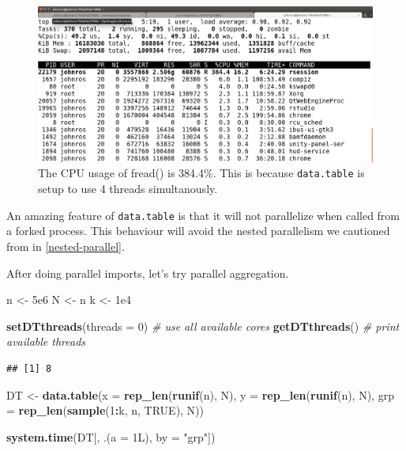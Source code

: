 \documentclass[]{book}
\newenvironment{Shaded}{\begin{snugshade}}{\end{snugshade}}
\newcommand{\CommentTok}[1]{\textcolor[rgb]{0.56,0.35,0.01}{\textit{#1}}}
\newcommand{\DataTypeTok}[1]{\textcolor[rgb]{0.13,0.29,0.53}{#1}}
\newcommand{\DecValTok}[1]{\textcolor[rgb]{0.00,0.00,0.81}{#1}}
\newcommand{\FloatTok}[1]{\textcolor[rgb]{0.00,0.00,0.81}{#1}}
\newcommand{\KeywordTok}[1]{\textcolor[rgb]{0.13,0.29,0.53}{\textbf{#1}}}
\newcommand{\NormalTok}[1]{#1}
\newcommand{\OperatorTok}[1]{\textcolor[rgb]{0.81,0.36,0.00}{\textbf{#1}}}
\newcommand{\OtherTok}[1]{\textcolor[rgb]{0.56,0.35,0.01}{#1}}
\newcommand{\StringTok}[1]{\textcolor[rgb]{0.31,0.60,0.02}{#1}}
\theoremstyle{definition}
\theoremstyle{definition}
\theoremstyle{definition}
\theoremstyle{remark}
\let\BeginKnitrBlock\begin \let\EndKnitrBlock\end
\begin{document}
\begin{figure}
\centering
\includegraphics{art/Screenshot from 2019-10-08 16-00-34.png}
\caption{The CPU usage of fread() is 384.4\%. This is because \texttt{data.table} is setup to use 4 threads simultanously.}
\end{figure}

\BeginKnitrBlock{remark}
{}An amazing feature of \texttt{data.table} is that it will not parallelize when called from a forked process.
This behaviour will avoid the nested parallelism we cautioned from in \ref{nested-parallel}.
\EndKnitrBlock{remark}

After doing parallel imports, let's try parallel aggregation.

\begin{Shaded}
\begin{Highlighting}[]
\NormalTok{n <-}\StringTok{  }\FloatTok{5e6}
\NormalTok{N <-}\StringTok{ }\NormalTok{n}
\NormalTok{k <-}\StringTok{  }\FloatTok{1e4}

\KeywordTok{setDTthreads}\NormalTok{(}\DataTypeTok{threads =} \DecValTok{0}\NormalTok{) }\CommentTok{# use all available cores}
\KeywordTok{getDTthreads}\NormalTok{() }\CommentTok{# print available threads}
\end{Highlighting}
\end{Shaded}

\begin{verbatim}
## [1] 8
\end{verbatim}

\begin{Shaded}
\begin{Highlighting}[]
\NormalTok{DT <-}\StringTok{  }\KeywordTok{data.table}\NormalTok{(}\DataTypeTok{x =} \KeywordTok{rep_len}\NormalTok{(}\KeywordTok{runif}\NormalTok{(n), N),}
                \DataTypeTok{y =} \KeywordTok{rep_len}\NormalTok{(}\KeywordTok{runif}\NormalTok{(n), N),}
                \DataTypeTok{grp =} \KeywordTok{rep_len}\NormalTok{(}\KeywordTok{sample}\NormalTok{(}\DecValTok{1}\OperatorTok{:}\NormalTok{k, n, }\OtherTok{TRUE}\NormalTok{), N))}

\KeywordTok{system.time}\NormalTok{(DT[, .(}\DataTypeTok{a =}\NormalTok{ 1L), }\DataTypeTok{by =} \StringTok{"grp"}\NormalTok{])}
\end{Highlighting}
\end{Shaded}
\end{document}
